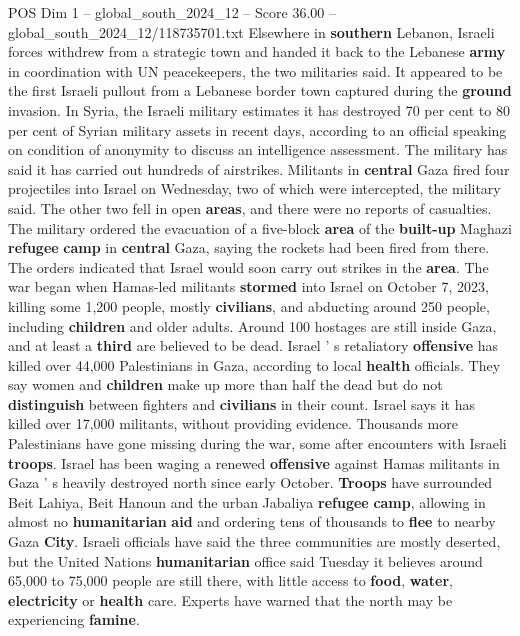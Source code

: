 \begin{textsample}{POS Dim 1 – global\_south\_2024\_12 – Score 36.00 – global\_south\_2024\_12/118735701.txt}
Elsewhere in \textbf{southern} Lebanon, Israeli forces withdrew from a strategic town and handed it back to the Lebanese \textbf{army} in coordination with UN peacekeepers, the two militaries said.
It appeared to be the first Israeli pullout from a Lebanese border town captured during the \textbf{ground} invasion.
In Syria, the Israeli military estimates it has destroyed 70 per cent to 80 per cent of Syrian military assets in recent days, according to an official speaking on condition of anonymity to discuss an intelligence assessment.
The military has said it has carried out hundreds of airstrikes.
Militants in \textbf{central} Gaza fired four projectiles into Israel on Wednesday, two of which were intercepted, the military said.
The other two fell in open \textbf{areas}, and there were no reports of casualties.
The military ordered the evacuation of a five-block \textbf{area} of the \textbf{built-up} Maghazi \textbf{refugee} \textbf{camp} in \textbf{central} Gaza, saying the rockets had been fired from there.
The orders indicated that Israel would soon carry out strikes in the \textbf{area}.
The war began when Hamas-led militants \textbf{stormed} into Israel on October 7, 2023, killing some 1,200 people, mostly \textbf{civilians}, and abducting around 250 people, including \textbf{children} and older adults.
Around 100 hostages are still inside Gaza, and at least a \textbf{third} are believed to be dead.
Israel ' s retaliatory \textbf{offensive} has killed over 44,000 Palestinians in Gaza, according to local \textbf{health} officials.
They say women and \textbf{children} make up more than half the dead but do not \textbf{distinguish} between fighters and \textbf{civilians} in their count.
Israel says it has killed over 17,000 militants, without providing evidence.
Thousands more Palestinians have gone missing during the war, some after encounters with Israeli \textbf{troops}.
Israel has been waging a renewed \textbf{offensive} against Hamas militants in Gaza ' s heavily destroyed north since early October. \textbf{Troops} have surrounded Beit Lahiya, Beit Hanoun and the urban Jabaliya \textbf{refugee} \textbf{camp}, allowing in almost no \textbf{humanitarian} \textbf{aid} and ordering tens of thousands to \textbf{flee} to nearby Gaza \textbf{City}.
Israeli officials have said the three communities are mostly deserted, but the United Nations \textbf{humanitarian} office said Tuesday it believes around 65,000 to 75,000 people are still there, with little access to \textbf{food}, \textbf{water}, \textbf{electricity} or \textbf{health} care.
Experts have warned that the north may be experiencing \textbf{famine}.

\end{textsample}

